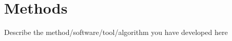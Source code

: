\chapter{Methods}\label{chap:methods}


Describe the method/software/tool/algorithm you have developed here